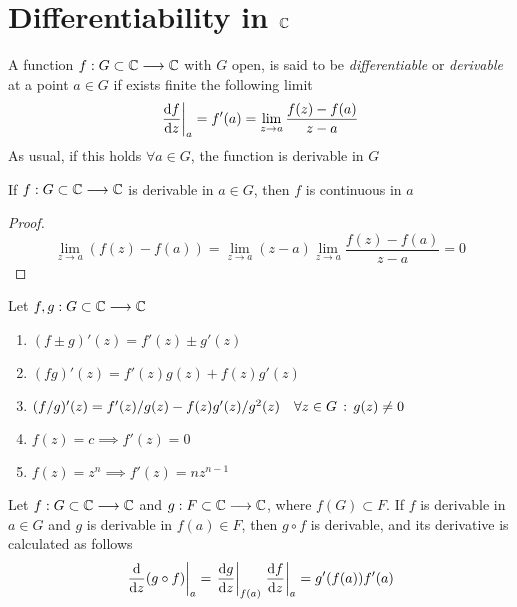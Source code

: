 \documentclass[../complete.tex]{subfiles}
\begin{document}
\section{Differentiability in $\mathbb{C}$}
\begin{dfn}[Differentiability]
	A function $f:G\subset\mathbb{C}\overset{}{\longrightarrow}\mathbb{C}$ with $G$ open, is said to be \textit{differentiable} or \textit{derivable} at a point $a\in G$ if exists finite the following limit
	\begin{equation}
		\derin[a]{\derivative{f}{z}}=f'(a)=\lim_{z\to a}\frac{f(z)-f(a)}{z-a}
		\label{eq:dercf}
	\end{equation}
	As usual, if this holds $\forall a\in G$, the function is derivable in $G$
\end{dfn}
\begin{thm}
	If $f:G\subset\mathbb{C}\overset{}{\longrightarrow}\mathbb{C}$ is derivable in $a\in G$, then $f$ is continuous in $a$
\end{thm}
\begin{proof}
	\begin{equation*}
		\lim_{z\to a}(f(z)-f(a))=\lim_{z\to a}(z-a)\lim_{z\to a}\frac{f(z)-f(a)}{z-a}=0
	\end{equation*}
\end{proof}
\begin{thm}
	Let $f,g:G\subset\mathbb{C}\overset{}{\longrightarrow}\mathbb{C}$
	\begin{enumerate}
	\item $(f\pm g)'(z)=f'(z)\pm g'(z)$
	\item $(fg)'(z)=f'(z)g(z)+f(z)g'(z)$
	\item $(f/g)'(z)=f'(z)/g(z)-f(z)g'(z)/g^2(z)\quad\forall z\in G\, :\,  g(z)\ne0$
	\item $f(z)=c\implies f'(z)=0$
	\item $f(z)=z^{n}\implies f'(z)=nz^{n-1}$
	\end{enumerate}
\end{thm}
\begin{thm}
	Let $f:G\subset\mathbb{C}\overset{}{\longrightarrow}\mathbb{C}$ and $g:F\subset\mathbb{C}\overset{}{\longrightarrow}\mathbb{C}$, where $f(G)\subset F$. If $f$ is derivable in $a\in G$ and $g$ is derivable in $f(a)\in F$, then $g\circ f$ is derivable, and its derivative is calculated as follows
	\begin{equation}
		\derin[a]{\derivative{z}(g\circ f)}=\derin[f(a)]{\derivative{g}{z}}\derin[a]{\derivative{f}{z}}=g'(f(a))f'(a)
		\label{eq:compositedercf}
	\end{equation}
\end{thm}
\end{document}
